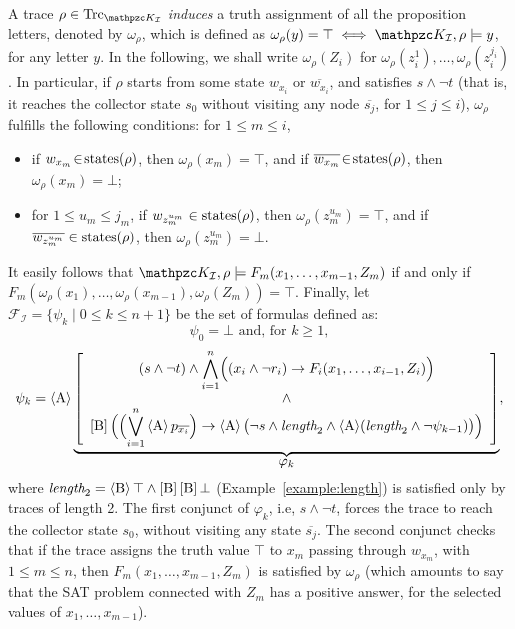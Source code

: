 A trace $\rho\in\Trk_{\Ku_\mathcal{I}}$ \emph{induces} a truth assignment of all the proposition letters, denoted by $\omega_\rho$, which is defined as $\omega_\rho(y)=\top \iff \Ku_\mathcal{I},\rho\models y$, for any letter $y$. 
In the following, we shall write $\omega_\rho(Z_i)$ for $\omega_\rho(z_i^1),\ldots , \omega_\rho(z_i^{j_i})$.
In particular, if $\rho$ starts from some state $w_{x_i}$ or $\overline{w_{x_i}}$, and satisfies $s\wedge \neg t$ (that is, it reaches the collector state $s_0$ without visiting any node $\overline{s_j}$, for $1\leq j \leq i$), $\omega_\rho$ fulfills the following conditions: 
for $1\leq m\leq i$,
\begin{itemize}
	\item if $w_{x_m}\!\in\!\operatorname{states}(\rho)$, then $\omega_\rho(x_m)\!=\!\top$, and if $\overline{w_{x_m}}\!\in\!\operatorname{states}(\rho)$, then $\omega_\rho(x_m)\!=\!\bot$;
	\item for $1\leq u_m\leq j_m$, if $w_{z_m^{u_m}}\in\operatorname{states}(\rho)$, then $\omega_\rho(z_m^{u_m})=\top$, and if $\overline{w_{z_m^{u_m}}}\in\operatorname{states}(\rho)$, then $\omega_\rho(z_m^{u_m})=\bot$.
\end{itemize}	
It easily follows that $\Ku_\mathcal{I},\rho\models F_m(x_1,\ldots , x_{m-1}, Z_m)$ if and only if 
$F_m(\omega_\rho(x_1), \ldots ,\allowbreak \omega_\rho(x_{m-1}),\omega_\rho(Z_m)) = \top$.
%
%
Finally, let $\mathcal{F}_\mathcal{I}=\{\psi_k \mid 0\leq k\leq n+1\}$ be the set of formulas defined as: 
\[\psi_0=\bot \mbox{ and, for  }k\geq 1,\]
%
\begin{equation*}
\psi_k = \operatorname{\langle A\rangle} \underbrace{\left[\begin{array}{c}
(s\wedge \neg t) \wedge \displaystyle{\bigwedge_{i=1}^n} \Big((x_i\wedge \neg r_i)\rightarrow F_i(x_1, \ldots, x_{i-1}, Z_i)\Big) \\ 
\wedge \\ 
\operatorname{\mathopen[ B \mathclose]} \Big( \Big(\displaystyle{\bigvee_{i=1}^n} \operatorname{\langle A\rangle} p_{\overline{x_i}}\Big)\rightarrow \operatorname{\langle A\rangle}\big(\neg s \wedge \textit{length}_2\wedge \operatorname{\langle A\rangle} (\textit{length}_2\wedge \neg\psi_{k-1})\big)\Big)
\end{array}\right]}_{\text{\normalsize $\varphi_k$}} ,
\end{equation*}
where $\textit{length}_2=\operatorname{\langle B\rangle} \top \wedge \operatorname{\mathopen[ B \mathclose]}\operatorname{\mathopen[ B \mathclose]}\bot$ (Example~\ref{example:length}) is satisfied only by traces of length 2.
The first conjunct of $\varphi_k$, i.e, $s\wedge \neg t$, forces the trace to reach the collector state $s_0$, without visiting any state $\overline{s_j}$. The second conjunct checks that if the trace assigns the truth value $\top$ to $x_m$ passing through $w_{x_m}$, with $1\leq m \leq n$, then $F_m(x_1,\ldots,x_{m-1},Z_m)$ is satisfied by $\omega_\rho$ (which amounts to say that the SAT problem connected with $Z_m$ has a positive answer, for the selected values of $x_1,\ldots,x_{m-1}$).
